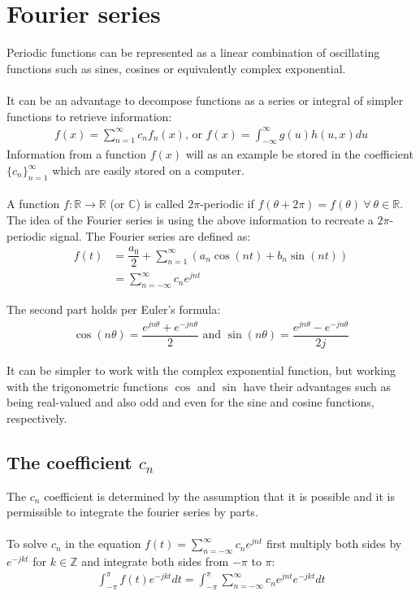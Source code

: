 \section{Fourier series}
Periodic functions can be represented as a linear combination of oscillating functions such as sines, cosines or equivalently complex exponential.
\\\\
It can be an advantage to decompose functions as a series or integral of simpler functions to retrieve information:
\begin{align*}
	f(x) = \sum_{n=1}^\infty c_n f_n(x)\text{, or } f(x)= \int_{-\infty}^\infty g(u) h(u,x) du
\end{align*}
Information from a function $f(x)$ will as an example be stored in the coefficient $\{c_n\}_{n=1}^\infty$ which are easily stored on a computer. 
\\ \\ 
A function $f: \mathbb{R} \to \mathbb{R}$ (or $\mathbb{C}$) is called $2\pi$-periodic if $f(\theta + 2\pi) = f(\theta) \ \forall \ \theta\in\mathbb{R}$. The idea of the Fourier series is using the above information to recreate a $2\pi$-periodic signal. The Fourier series are defined as:
\begin{align*}
	f(t) &= \dfrac{a_0}{2} + \sum_{n=1}^\infty(a_n \cos(n t) + b_n \sin(n t))\\
	&= \sum_{n=-\infty}^{\infty} c_n e^{j n t} 
\end{align*}

The second part holds per Euler's formula:
\begin{align*}
	\cos(n\theta) = \dfrac{e^{j n \theta} + e^{-j n \theta}}{2} \text{ and } \sin(n \theta) = \dfrac{e^{jn\theta}-e^{-jn\theta}}{2j}
\end{align*}

It can be simpler to work with the complex exponential function, but working with the trigonometric functions $\cos$ and $\sin$ have their advantages such as being real-valued and also odd and even for the sine and cosine functions, respectively.

\subsection{The coefficient $c_n$}
The $c_n$ coefficient is determined by the assumption that it is possible and it is permissible to integrate the fourier series by parts.
\\ \\
To solve $c_n$ in the equation $f(t)= \sum_{n=-\infty}^{\infty} c_n e^{j n t}$ first multiply both sides by $e^{-j k t}$ for $k\in \mathbb{Z}$ and integrate both sides from $-\pi$ to $\pi$:
\begin{align} \label{eq:firststep_fouriercoefficient}
\int_{-\pi}^\pi f(t)e^{-j k t} dt = \int_{-\pi}^\pi \sum_{n=-\infty}^{\infty} c_n e^{j n t} e^{-j k t} dt
\end{align}

